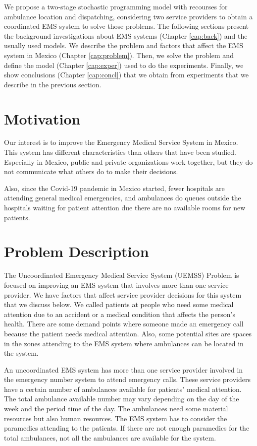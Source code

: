 We propose a two-stage stochastic programming model with recourses for ambulance location and dispatching, considering two service providers to obtain a coordinated EMS system to solve those problems. The following sections present the background investigations about EMS sys\-tems (Chapter \ref{cap:back}) and the usually used models. We describe the problem and factors that affect the EMS system in Mexico (Chapter \ref{cap:problem}). Then, we solve the problem and define the model (Chapter \ref{cap:exper}) used to do the experiments. Finally, we show conclusions (Chapter \ref{cap:concl}) that we obtain from experiments that we describe in the previous section.

\section{Motivation}
Our interest is to improve the Emergency Medical Service System in Mexico. This system has different characteristics than others that have been studied. Especially in Mexico, public and private organizations work together, but they do not communicate what others do to make their decisions. 

Also, since the Covid-19 pandemic in Mexico started, fewer hospitals are attending general medical emergencies, and ambulances do queues outside the hos\-pi\-tals waiting for patient attention due there are no available rooms for new patients. 

\section{Problem Description}
The Uncoordinated Emergency Medical Service System (UEMSS) Problem is focused on improving an EMS system that involves more than one service provider. We have factors that affect service provider decisions for this system that we discuss below. We called patients at people who need some medical attention due to an accident or a medical condition that affects the person's health. There are some demand points where someone made an emergency call because the patient needs medical attention. Also, some potential sites are spaces in the zones attending to the EMS system where ambulances can be located in the system.

An uncoordinated EMS system has more than one service provider involved in the emergency number system to attend emergency calls. These service providers have a certain number of ambulances available for patients' medical attention. The total ambulance available number may vary depending on the day of the week and the period time of the day. The ambulances need some material resources but also human resources. The EMS system has to consider the paramedics attending to the patients. If there are not enough paramedics for the total ambulances, not all the ambulances are available for the system. 

